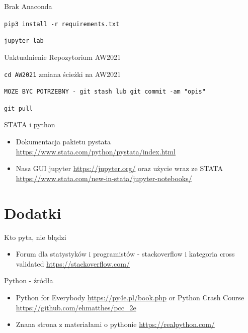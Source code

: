 \documentclass{beamer}
\begin{document}
\begin{frame}{Brak Anaconda}
  \item \texttt{pip3 install -r requirements.txt}
  \item \texttt{jupyter lab}
\end{frame}

\begin{frame}{Uaktualnienie Repozytorium AW2021}
  \item \texttt{cd AW2021} zmiana ścieżki na AW2021
  \item \texttt{MOZE BYC POTRZEBNY - git stash lub git commit -am "opis"}
  \item \texttt{git pull}
\end{frame}

\begin{frame}{STATA i python}
  \begin{itemize}
  \item Dokumentacja pakietu pystata \url{https://www.stata.com/python/pystata/index.html}
  \item Nasz GUI jupyter \url{https://jupyter.org/} oraz użycie wraz ze STATA \url{https://www.stata.com/new-in-stata/jupyter-notebooks/}
  \end{itemize}
\end{frame}

\section{Dodatki}

\begin{frame}{Kto pyta, nie błądzi}
  \begin{itemize}
  \item Forum dla statystyków i programistów - stackoverflow i kategoria cross validated \url{https://stackoverflow.com/}
  \end{itemize}
\end{frame}

\begin{frame}{Python - źródła}
  \begin{itemize}
  \item Python for Everybody \url{https://py4e.pl/book.php} or Python Crash Course \url{https://github.com/ehmatthes/pcc_2e}
  \item Znana strona z materiałami o pythonie \url{https://realpython.com/}
  \end{itemize}
\end{frame}
\end{document}
